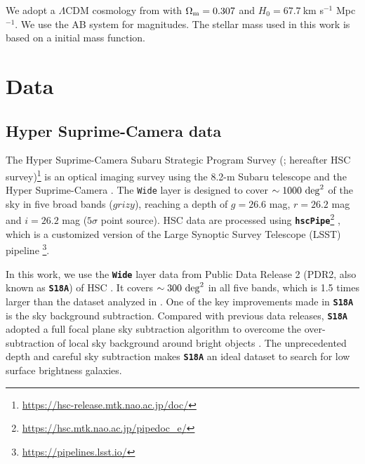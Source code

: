 \documentclass[twocolumn,astrosymb,twocolappendix]{aastex631}
\newcommand{\code}[1]{\textbf{\texttt{#1}}}
\begin{document}
\begin{CJK*}{UTF8}{gbsn}
We adopt a $\Lambda$CDM cosmology from \citet{Planck15} with $\Omega_{\rm m}= 0.307$ and $H_0 = 67.7\ $km s$^{-1}$ Mpc$^{-1}$. We use the AB system \citep{Oke1983} for magnitudes. The stellar mass used in this work is based on a \citet{Chabrier2003} initial mass function.

\section{Data} \label{sec:data}
\subsection{Hyper Suprime-Camera data}
The Hyper Suprime-Camera Subaru Strategic Program Survey (\citealt{Aihara2018}; hereafter HSC survey)\footnote{\url{https://hsc-release.mtk.nao.ac.jp/doc/}} is an optical imaging survey using the 8.2-m Subaru telescope and the Hyper Suprime-Camera \citep{Miyazaki2012, Miyazaki2018}. The \texttt{Wide} layer is designed to cover $\sim 1000\ \rm{deg}^{2}$ of the sky in five broad bands ($grizy$), reaching a depth of $g=26.6$ mag, $r=26.2$ mag and $i=26.2$ mag ($5\sigma$ point source). HSC data are processed using \code{hscPipe}\footnote{\url{https://hsc.mtk.nao.ac.jp/pipedoc_e/}} \citep{Bosch2018}, which is a customized version of the Large Synoptic Survey Telescope (LSST) pipeline \citep{LSST-pipeline}\footnote{\url{https://pipelines.lsst.io/}}. 

In this work, we use the \code{Wide} layer data from Public Data Release 2 (PDR2, also known as \code{S18A}) of HSC \citealt{Aihara2018}. It covers $\sim 300\ \rm{deg}^2$ in all five bands, which is 1.5 times larger than the dataset analyzed in . One of the key improvements made in \code{S18A} is the sky background subtraction. Compared with previous data releases, \code{S18A} adopted a full focal plane sky subtraction algorithm to overcome the over-subtraction of local sky background around bright objects \citep{Aihara2018,Li2021}. The unprecedented depth and careful sky subtraction makes \code{S18A} an ideal dataset to search for low surface brightness galaxies. 



\end{CJK*}
\end{document}

